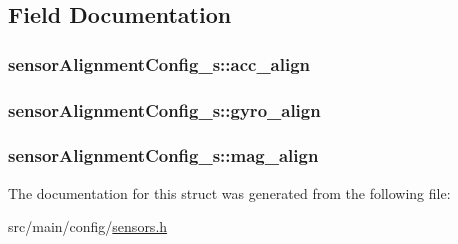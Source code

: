 \subsection{Field Documentation}
\hypertarget{structsensorAlignmentConfig__s_a70199f95983c9a3a6f6c85b00cff8219}{
\subsubsection[{acc\+\_\+align}]{ sensor\+Alignment\+Config\+\_\+s\+::acc\+\_\+align}}\label{structsensorAlignmentConfig__s_a70199f95983c9a3a6f6c85b00cff8219}
\hypertarget{structsensorAlignmentConfig__s_a4574ce500beb845e45312d1470bdbdfe}{
\subsubsection[{gyro\+\_\+align}]{ sensor\+Alignment\+Config\+\_\+s\+::gyro\+\_\+align}}\label{structsensorAlignmentConfig__s_a4574ce500beb845e45312d1470bdbdfe}
\hypertarget{structsensorAlignmentConfig__s_a16c1dbaa2e5893897884471ae4055f0e}{
\subsubsection[{mag\+\_\+align}]{ sensor\+Alignment\+Config\+\_\+s\+::mag\+\_\+align}}\label{structsensorAlignmentConfig__s_a16c1dbaa2e5893897884471ae4055f0e}


The documentation for this struct was generated from the following file\+:\begin{DoxyCompactItemize}
\item 
src/main/config/\hyperlink{sensors_8h}{sensors.\+h}\end{DoxyCompactItemize}
